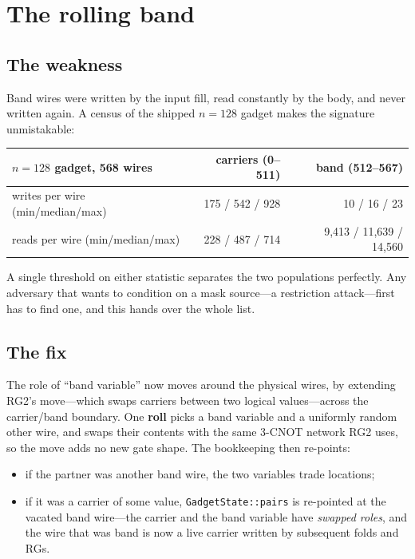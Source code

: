 \documentclass[11pt]{article}
\begin{document}
\section{The rolling band}

\subsection{The weakness}

Band wires were written by the input fill, read constantly by the body, and
never written again. A census of the shipped $n{=}128$ gadget makes the
signature unmistakable:

\begin{center}
\begin{tabular}{lrr}
\toprule
$n{=}128$ gadget, 568 wires & carriers (0--511) & band (512--567) \\
\midrule
writes per wire (min/median/max) & 175 / 542 / 928 & 10 / 16 / 23 \\
reads per wire (min/median/max) & 228 / 487 / 714 & 9{,}413 / 11{,}639 / 14{,}560 \\
\bottomrule
\end{tabular}
\end{center}

A single threshold on either statistic separates the two populations perfectly.
Any adversary that wants to condition on a mask source---a restriction
attack---first has to find one, and this hands over the whole list.

\subsection{The fix}

The role of ``band variable'' now moves around the physical wires, by extending
RG2's move---which swaps carriers between two logical values---across the
carrier/band boundary. One \textbf{roll} picks a band variable and a uniformly
random other wire, and swaps their contents with the same 3-CNOT network RG2
uses, so the move adds no new gate shape. The bookkeeping then re-points:
\begin{itemize}
\item if the partner was another band wire, the two variables trade locations;
\item if it was a carrier of some value, \texttt{GadgetState::pairs} is
re-pointed at the vacated band wire---the carrier and the band variable have
\emph{swapped roles}, and the wire that was band is now a live carrier written
by subsequent folds and RGs.
\end{itemize}
\end{document}
